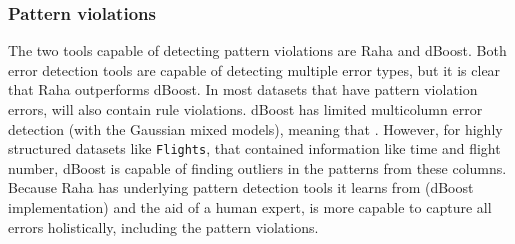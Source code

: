 

\subsubsection{Pattern violations}
The two tools capable of detecting pattern violations are Raha and dBoost. Both error detection tools are capable of detecting multiple error types, but it is clear that Raha outperforms dBoost. In most datasets that have pattern violation errors, will also contain rule violations. dBoost has limited multicolumn error detection (with the Gaussian mixed models), meaning that . However, for highly structured datasets like \verb|Flights|, that contained information like time and flight number, dBoost is capable of finding outliers in the patterns from these columns.
Because Raha has underlying pattern detection tools it learns from (dBoost implementation) and the aid of a human expert, is more capable to capture all errors holistically, including the pattern violations.

